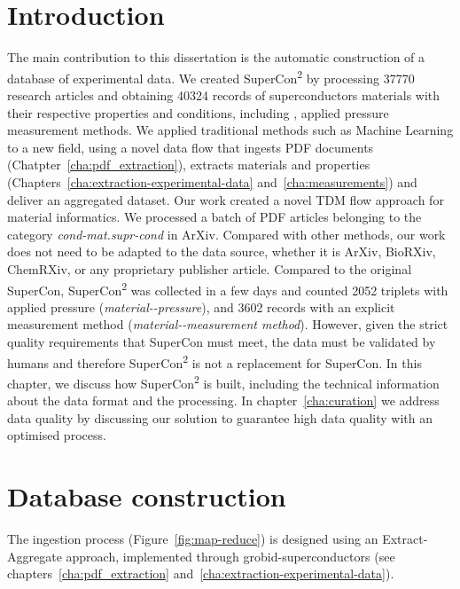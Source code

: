 \section{Introduction}

The main contribution to this dissertation is the automatic construction of a database of experimental data.
We created SuperCon\textsuperscript{2} by processing 37770 research articles and obtaining 40324 records of superconductors materials with their respective properties and conditions, including \tc, applied pressure measurement methods. 
We applied traditional methods such as Machine Learning to a new field, using a novel data flow that ingests PDF documents (Chatpter~\ref{cha:pdf_extraction}), extracts materials and properties (Chapters~\ref{cha:extraction-experimental-data} and~\ref{cha:measurements}) and deliver an aggregated dataset. 
Our work created a novel TDM flow approach for material informatics. We processed a batch of PDF articles belonging to the category \textit{ cond-mat.supr-cond} in ArXiv. Compared with other methods, our work does not need to be adapted to the data source, whether it is ArXiv, BioRXiv, ChemRXiv, or any proprietary publisher article.  
Compared to the original SuperCon, SuperCon\textsuperscript{2} was collected in a few days and counted 2052 triplets with applied pressure (\textit{material-\tc-pressure}), and 3602 records with an explicit measurement method (\textit{material-\tc-measurement method}).
However, given the strict quality requirements that SuperCon must meet, the data must be validated by humans and therefore SuperCon\textsuperscript{2} is not a replacement for SuperCon. 
In this chapter, we discuss how SuperCon\textsuperscript{2} is built, including the technical information about the data format and the processing. 
In chapter~\ref{cha:curation} we address data quality by discussing our solution to guarantee high data quality with an optimised process. 


\section{Database construction}
\label{sec:ingestion}

The ingestion process (Figure~\ref{fig:map-reduce}) is designed using an Extract-Aggregate approach, implemented through grobid-superconductors (see chapters~\ref{cha:pdf_extraction} and~\ref{cha:extraction-experimental-data}).

